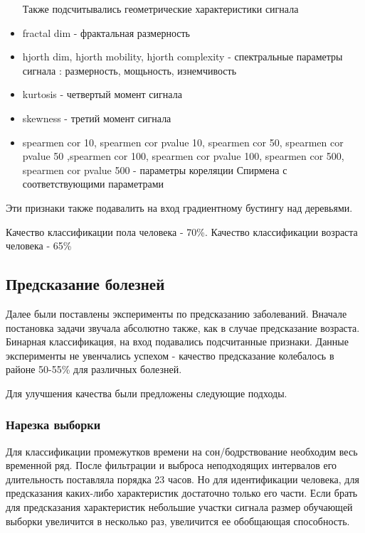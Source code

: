 \begin{itemize}
	Также подсчитывались геометрические характеристики сигнала
	
	\item fractal dim - фрактальная размерность
	\item hjorth dim, hjorth mobility, hjorth complexity - спектральные параметры сигнала : размерность, мощьность, изнемчивость
	\item kurtosis - четвертый момент сигнала
	\item skewness - третий момент сигнала
	\item spearmen cor 10, spearmen cor pvalue 10, spearmen cor 50, spearmen cor pvalue 50	
	,spearmen cor 100, spearmen cor pvalue 100, spearmen cor 500, spearmen cor pvalue 500 - 
	параметры кореляции Спирмена с соответствующими параметрами
\end{itemize}
Эти признаки также подавалить на вход градиентному бустингу над деревьями. 

Качество классификации пола человека - 70\%.
Качество классификации возраста человека - 65\%


\subsection{Предсказание болезней}

Далее были поставлены эксперименты по предсказанию заболеваний. Вначале постановка задачи звучала абсолютно также, как в случае предсказание возраста. Бинарная классификация, на вход подавались подсчитанные признаки. Данные эксперименты не увенчались успехом - качество предсказание колебалось в районе 50-55\% для различных болезней.

Для улучшения качества были предложены следующие подходы.

\subsubsection{Нарезка выборки}
Для классификации промежутков времени на сон/бодрствование необходим весь временной ряд. После фильтрации и выброса неподходящих интервалов его длительность поставляла порядка 23 часов. Но для идентификации человека, для предсказания каких-либо характеристик достаточно только его части. Если брать для предсказания характеристик небольшие участки сигнала размер обучающей выборки увеличится в несколько раз, увеличится ее обобщающая способность.

